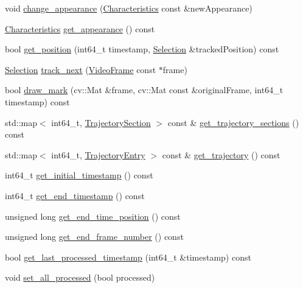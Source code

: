 \begin{DoxyCompactItemize}
\item 
void \hyperlink{classTrackedObject_a3f45315ecc8fcabeff15baefe19a5873}{change\+\_\+appearance} (\hyperlink{structCharacteristics}{Characteristics} const \&new\+Appearance)
\item 
\hyperlink{structCharacteristics}{Characteristics} \hyperlink{classTrackedObject_a798947c38b78d2c4da95cefa75a4d055}{get\+\_\+appearance} () const 
\item 
bool \hyperlink{classTrackedObject_af5b7f92c243707b5e2dfba099b50a3bd}{get\+\_\+position} (int64\+\_\+t timestamp, \hyperlink{structSelection}{Selection} \&tracked\+Position) const 
\item 
\hyperlink{structSelection}{Selection} \hyperlink{classTrackedObject_ae5dbab7c99f67ebfb2652ff01bfb34ff}{track\+\_\+next} (\hyperlink{classVideoFrame}{Video\+Frame} const $\ast$frame)
\item 
bool \hyperlink{classTrackedObject_a0ae55bacfcc78767b4d6ebe60a56db02}{draw\+\_\+mark} (cv\+::\+Mat \&frame, cv\+::\+Mat const \&original\+Frame, int64\+\_\+t timestamp) const 
\item 
std\+::map$<$ int64\+\_\+t, \hyperlink{structTrajectorySection}{Trajectory\+Section} $>$ const \& \hyperlink{classTrackedObject_af5fbc14bdee8d07311a9ba1ae9a32fd1}{get\+\_\+trajectory\+\_\+sections} () const 
\item 
std\+::map$<$ int64\+\_\+t, \hyperlink{structTrajectoryEntry}{Trajectory\+Entry} $>$ const \& \hyperlink{classTrackedObject_a1dc7353a75375f52a5c50296d77accb1}{get\+\_\+trajectory} () const 
\item 
int64\+\_\+t \hyperlink{classTrackedObject_a8a3294129b27947d40b2ccfa56bf578f}{get\+\_\+initial\+\_\+timestamp} () const 
\item 
int64\+\_\+t \hyperlink{classTrackedObject_a53303d656ec1a2cb664fdf3e9f4864af}{get\+\_\+end\+\_\+timestamp} () const 
\item 
unsigned long \hyperlink{classTrackedObject_a6899113e3ea7e025944e0ebb1fe38e93}{get\+\_\+end\+\_\+time\+\_\+position} () const 
\item 
unsigned long \hyperlink{classTrackedObject_acd0994794b432d6719196694f3718eda}{get\+\_\+end\+\_\+frame\+\_\+number} () const 
\item 
bool \hyperlink{classTrackedObject_a9dc31fd996676625f1ff96ce0d3e06ba}{get\+\_\+last\+\_\+processed\+\_\+timestamp} (int64\+\_\+t \&timestamp) const 
\item 
void \hyperlink{classTrackedObject_a000d56a6c6ac09ae5ee8b9e9fd016166}{set\+\_\+all\+\_\+processed} (bool processed)

\end{DoxyCompactItemize}
